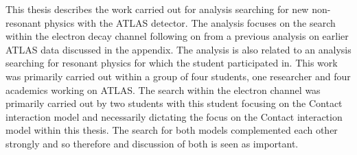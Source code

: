This thesis describes the work carried out for analysis searching for new non-resonant physics with the ATLAS detector. The analysis focuses on the search within the electron decay channel following on from a previous analysis on earlier ATLAS data discussed in the appendix. The analysis is also related to an analysis searching for resonant physics for which the student participated in. This work was primarily carried out within a group of four students, one researcher and four academics working on ATLAS. The search within the electron channel was primarily carried out by two students with this student focusing on the Contact interaction model and necessarily dictating the focus on the Contact interaction model within this thesis. The search for both models complemented each other strongly and so therefore and discussion of both is seen as important. 



















